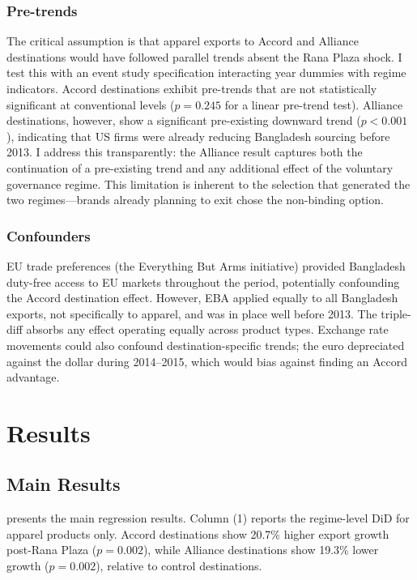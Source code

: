 \documentclass[12pt]{article}
\begin{document}
\subsubsection*{Pre-trends} The critical assumption is that apparel exports to Accord and Alliance destinations would have followed parallel trends absent the Rana Plaza shock. I test this with an event study specification interacting year dummies with regime indicators. Accord destinations exhibit pre-trends that are not statistically significant at conventional levels ($p = 0.245$ for a linear pre-trend test). Alliance destinations, however, show a significant pre-existing downward trend ($p < 0.001$), indicating that US firms were already reducing Bangladesh sourcing before 2013. I address this transparently: the Alliance result captures both the continuation of a pre-existing trend and any additional effect of the voluntary governance regime. This limitation is inherent to the selection that generated the two regimes---brands already planning to exit chose the non-binding option.

\subsubsection*{Confounders} EU trade preferences (the Everything But Arms initiative) provided Bangladesh duty-free access to EU markets throughout the period, potentially confounding the Accord destination effect. However, EBA applied equally to all Bangladesh exports, not specifically to apparel, and was in place well before 2013. The triple-diff absorbs any effect operating equally across product types. Exchange rate movements could also confound destination-specific trends; the euro depreciated against the dollar during 2014--2015, which would bias against finding an Accord advantage.


\section{Results}
\label{sec:results}

\subsection{Main Results}

 presents the main regression results. Column (1) reports the regime-level DiD for apparel products only. Accord destinations show 20.7\% higher export growth post-Rana Plaza ($p = 0.002$), while Alliance destinations show 19.3\% lower growth ($p = 0.002$), relative to control destinations.
\end{document}
